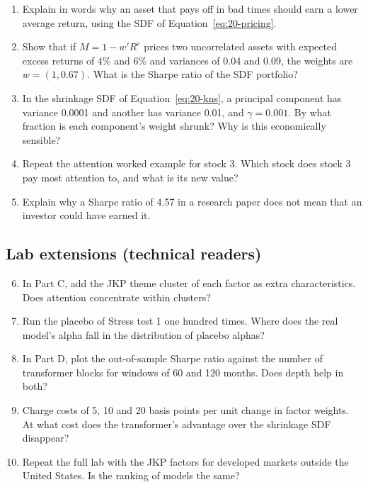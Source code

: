 \begin{enumerate}
  \item Explain in words why an asset that pays off in bad times should earn a lower average return, using the SDF of Equation~\eqref{eq:20-pricing}.
  \item Show that if $M = 1 - w'R^e$ prices two uncorrelated assets with expected excess returns of 4\% and 6\% and variances of 0.04 and 0.09, the weights are $w = (1, 0.67)$. What is the Sharpe ratio of the SDF portfolio?
  \item In the shrinkage SDF of Equation~\eqref{eq:20-kns}, a principal component has variance 0.0001 and another has variance 0.01, and $\gamma = 0.001$. By what fraction is each component's weight shrunk? Why is this economically sensible?
  \item Repeat the attention worked example for stock 3. Which stock does stock 3 pay most attention to, and what is its new value?
  \item Explain why a Sharpe ratio of 4.57 in a research paper does not mean that an investor could have earned it.
\end{enumerate}

\subsection*{Lab extensions (technical readers)}

\begin{enumerate}
  \setcounter{enumi}{5}
  \item In Part C, add the JKP theme cluster of each factor as extra characteristics. Does attention concentrate within clusters?
  \item Run the placebo of Stress test 1 one hundred times. Where does the real model's alpha fall in the distribution of placebo alphas?
  \item In Part D, plot the out-of-sample Sharpe ratio against the number of transformer blocks for windows of 60 and 120 months. Does depth help in both?
  \item Charge costs of 5, 10 and 20 basis points per unit change in factor weights. At what cost does the transformer's advantage over the shrinkage SDF disappear?
  \item Repeat the full lab with the JKP factors for developed markets outside the United States. Is the ranking of models the same?
\end{enumerate}
